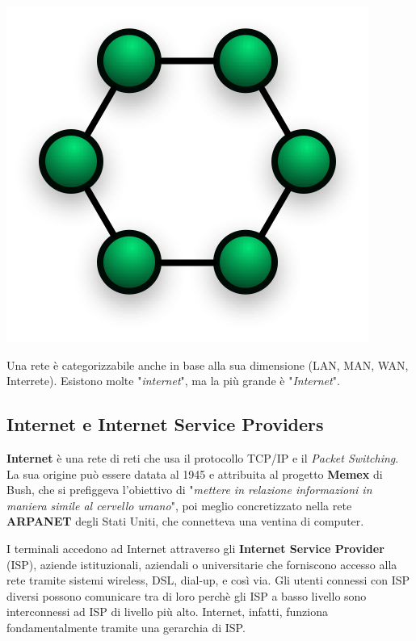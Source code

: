 \begin{itemize}
            \begin{center}
                \includegraphics[scale=0.25]{images/RingNetwork.png}
            \end{center}
        \end{itemize}
        
        Una rete è categorizzabile anche in base alla sua dimensione (LAN, MAN, WAN, Interrete). Esistono molte "\textit{internet}", ma la più grande è "\textit{Internet}".
    
    \subsection{Internet e Internet Service Providers}
    
        \textbf{Internet} è una rete di reti che usa il protocollo TCP/IP e il \textit{Packet Switching}. La sua origine può essere datata al 1945 e attribuita al progetto \textbf{Memex} di Bush, che si prefiggeva l'obiettivo di "\textit{mettere in relazione informazioni in maniera simile al cervello umano}", poi meglio concretizzato nella rete \textbf{ARPANET} degli Stati Uniti, che connetteva una ventina di computer.
        
        \vspace{3mm}
        
        I terminali accedono ad Internet attraverso gli \textbf{Internet Service Provider} (ISP), aziende istituzionali, aziendali o universitarie che forniscono accesso alla rete tramite sistemi wireless, DSL, dial-up, e così via. Gli utenti connessi con ISP diversi possono comunicare tra di loro perchè gli ISP a basso livello sono interconnessi ad ISP di livello più alto. Internet, infatti, funziona fondamentalmente tramite una gerarchia di ISP.
        
